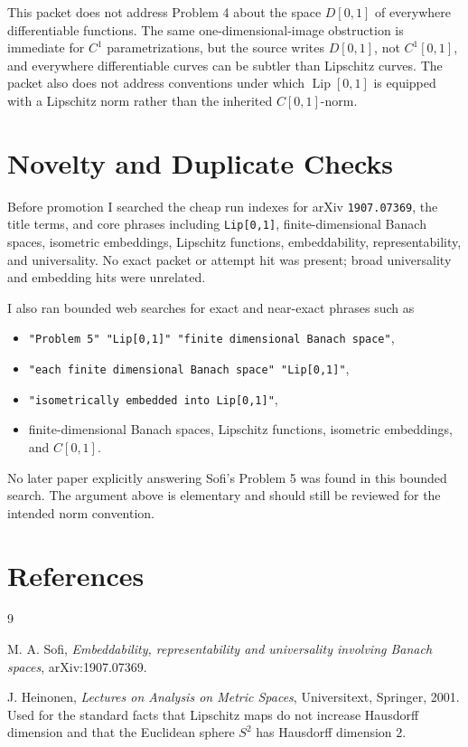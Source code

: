 \documentclass[11pt]{article}
\DeclareMathOperator{\Lip}{Lip}
\begin{document}
This packet does not address Problem 4 about the space \(D[0,1]\) of everywhere differentiable functions.  The same one-dimensional-image obstruction is immediate for \(C^1\) parametrizations, but the source writes \(D[0,1]\), not \(C^1[0,1]\), and everywhere differentiable curves can be subtler than Lipschitz curves.  The packet also does not address conventions under which \(\Lip[0,1]\) is equipped with a Lipschitz norm rather than the inherited \(C[0,1]\)-norm.

\section*{Novelty and Duplicate Checks}

Before promotion I searched the cheap run indexes for arXiv \texttt{1907.07369}, the title terms, and core phrases including \texttt{Lip[0,1]}, finite-dimensional Banach spaces, isometric embeddings, Lipschitz functions, embeddability, representability, and universality.  No exact packet or attempt hit was present; broad universality and embedding hits were unrelated.

I also ran bounded web searches for exact and near-exact phrases such as
\begin{itemize}
\item \texttt{"Problem 5" "Lip[0,1]" "finite dimensional Banach space"},
\item \texttt{"each finite dimensional Banach space" "Lip[0,1]"},
\item \texttt{"isometrically embedded into Lip[0,1]"},
\item finite-dimensional Banach spaces, Lipschitz functions, isometric embeddings, and \(C[0,1]\).
\end{itemize}
No later paper explicitly answering Sofi's Problem 5 was found in this bounded search.  The argument above is elementary and should still be reviewed for the intended norm convention.

\section*{References}

\begin{thebibliography}{9}

M. A. Sofi, \emph{Embeddability, representability and universality involving Banach spaces}, arXiv:1907.07369.

J. Heinonen, \emph{Lectures on Analysis on Metric Spaces}, Universitext, Springer, 2001.  Used for the standard facts that Lipschitz maps do not increase Hausdorff dimension and that the Euclidean sphere \(S^2\) has Hausdorff dimension \(2\).

\end{thebibliography}
\end{document}
